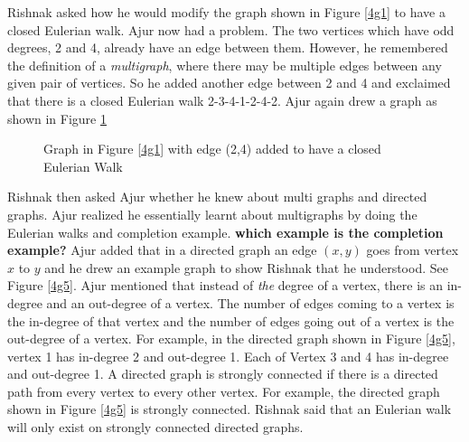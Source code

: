 Rishnak asked how he would modify the graph shown in Figure \ref{4g1} to have a closed Eulerian walk. Ajur now had a problem. The two vertices which have odd degrees, 2 and 4, already have an edge between them. However, he remembered the definition of a \emph{multigraph}, where there may be multiple edges between any given pair of vertices. So he added another edge between 2 and 4 and exclaimed that there is a closed Eulerian walk 2-3-4-1-2-4-2. Ajur again drew a graph as shown in Figure \ref{4g155}
\begin{figure}
\begin{center}
\caption{ Graph in Figure \ref{4g1} with edge (2,4) added to have a closed Eulerian Walk}\label{4g155}
\end{center}
\end{figure}

\vspace{3in}
Rishnak then asked Ajur whether he knew about multi graphs and directed graphs. Ajur realized he essentially learnt about multigraphs  by doing the Eulerian walks and completion  example. \textbf{which example is the completion example?} Ajur added that in a directed graph an edge $(x,y)$ goes from vertex $x$ to $y$ and he drew an example graph to show Rishnak that he understood. See Figure \ref{4g5}. 
Ajur mentioned that instead of \emph{the} degree of a vertex, there is an in-degree and an out-degree of a vertex. The number of edges coming to a vertex is the in-degree of that vertex and the number of edges going out of a vertex is the out-degree of a vertex. For example, in the directed graph shown in Figure \ref{4g5}, vertex 1 has in-degree 2 and out-degree 1. Each of Vertex 3 and 4 has in-degree  and out-degree 1. A directed graph is strongly connected if there is a directed path from every vertex to every other vertex. For example, the directed graph shown in Figure \ref{4g5} is strongly connected. Rishnak said that an Eulerian walk will only exist on strongly connected directed graphs.

